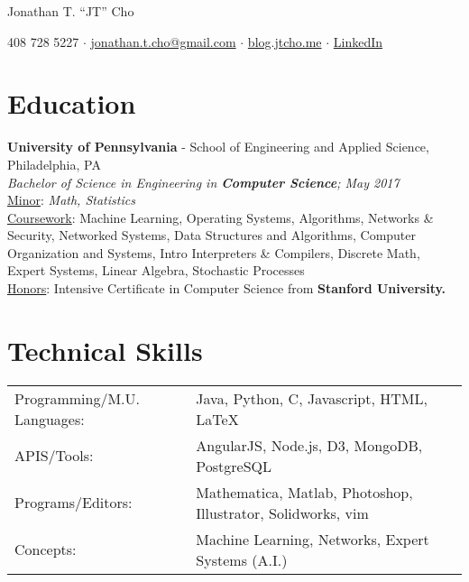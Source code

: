 \documentclass{resume}[10pt, a4paper]
\begin{document}
\begin{center}
    \huge Jonathan T. ``JT'' Cho
\end{center}


\begin{center}
    \large 408 728 5227 $\cdot$ \href{mailto:jonathan.t.cho@gmail.com}{jonathan.t.cho@gmail.com} $\cdot$ \href{http://blog.jtcho.me}{blog.jtcho.me} $\cdot$ \href{https://www.linkedin.com/in/jtcho}{LinkedIn}
\end{center}

\section{Education}
\textbf{University of Pennsylvania} - School of Engineering and Applied Science, Philadelphia, PA\\
\textit{Bachelor of Science in Engineering in \textbf{Computer Science}; May 2017}\\
\ul{Minor}: \textit{Math, Statistics}\\
\ul{Coursework}:
Machine Learning, Operating Systems, Algorithms, Networks \& Security, Networked Systems, Data Structures and Algorithms, Computer Organization and Systems, Intro Interpreters \& Compilers, Discrete Math, Expert Systems, Linear Algebra, Stochastic Processes\\
\ul{Honors}: Intensive Certificate in Computer Science from \textbf{Stanford University.}

\section{Technical Skills}
\begin{tabular}{l l}
    Programming/M.U. Languages:&Java, Python, C, Javascript, HTML, \LaTeX\\
               APIS/Tools:&AngularJS, Node.js, D3, MongoDB, PostgreSQL\\
         Programs/Editors:&Mathematica, Matlab, Photoshop, Illustrator, Solidworks, vim\\
                 Concepts:&Machine Learning, Networks, Expert Systems (A.I.)
\end{tabular}
\end{document}
